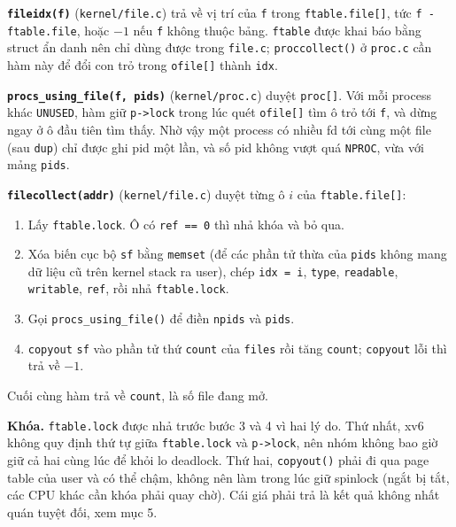 \textbf{\texttt{fileidx(f)}} (\texttt{kernel/file.c}) trả về vị trí của \texttt{f} trong \texttt{ftable.file[]}, tức \texttt{f - ftable.file}, hoặc $-1$ nếu \texttt{f} không thuộc bảng. \texttt{ftable} được khai báo bằng struct ẩn danh nên chỉ dùng được trong \texttt{file.c}; \texttt{proccollect()} ở \texttt{proc.c} cần hàm này để đổi con trỏ trong \texttt{ofile[]} thành \texttt{idx}.

\textbf{\texttt{procs\_using\_file(f, pids)}} (\texttt{kernel/proc.c}) duyệt \texttt{proc[]}. Với mỗi process khác \texttt{UNUSED}, hàm giữ \texttt{p->lock} trong lúc quét \texttt{ofile[]} tìm ô trỏ tới \texttt{f}, và dừng ngay ở ô đầu tiên tìm thấy. Nhờ vậy một process có nhiều fd tới cùng một file (sau \texttt{dup}) chỉ được ghi pid một lần, và số pid không vượt quá \texttt{NPROC}, vừa với mảng \texttt{pids}.

\textbf{\texttt{filecollect(addr)}} (\texttt{kernel/file.c}) duyệt từng ô $i$ của \texttt{ftable.file[]}:
\begin{enumerate}
    \item Lấy \texttt{ftable.lock}. Ô có \texttt{ref == 0} thì nhả khóa và bỏ qua.
    \item Xóa biến cục bộ \texttt{sf} bằng \texttt{memset} (để các phần tử thừa của \texttt{pids} không mang dữ liệu cũ trên kernel stack ra user), chép \texttt{idx = i}, \texttt{type}, \texttt{readable}, \texttt{writable}, \texttt{ref}, rồi nhả \texttt{ftable.lock}.
    \item Gọi \texttt{procs\_using\_file()} để điền \texttt{npids} và \texttt{pids}.
    \item \texttt{copyout} \texttt{sf} vào phần tử thứ \texttt{count} của \texttt{files} rồi tăng \texttt{count}; \texttt{copyout} lỗi thì trả về $-1$.
\end{enumerate}
Cuối cùng hàm trả về \texttt{count}, là số file đang mở.

\textbf{Khóa.} \texttt{ftable.lock} được nhả trước bước 3 và 4 vì hai lý do. Thứ nhất, xv6 không quy định thứ tự giữa \texttt{ftable.lock} và \texttt{p->lock}, nên nhóm không bao giờ giữ cả hai cùng lúc để khỏi lo deadlock. Thứ hai, \texttt{copyout()} phải đi qua page table của user và có thể chậm, không nên làm trong lúc giữ spinlock (ngắt bị tắt, các CPU khác cần khóa phải quay chờ). Cái giá phải trả là kết quả không nhất quán tuyệt đối, xem mục 5.

